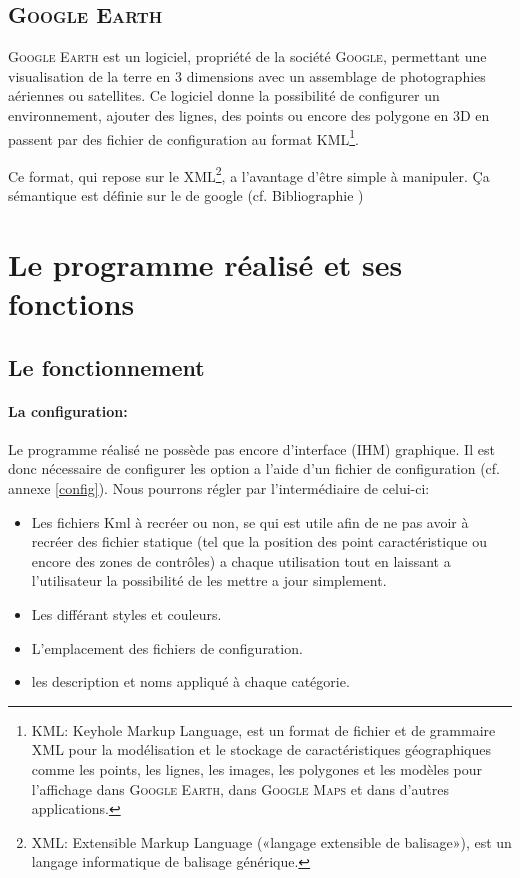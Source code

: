     \subsection{\textsc{Google Earth}}
\textsc{Google Earth} est un logiciel, propriété de la société \textsc{Google}, permettant une visualisation de la terre en 3 dimensions avec un assemblage de photographies aériennes ou satellites. Ce logiciel donne la possibilité de configurer un environnement, ajouter des lignes, des points ou encore des polygone en 3D en passent par des fichier de configuration au format KML\footnote{\label{Kml}KML: Keyhole Markup Language, est un format de fichier et de grammaire XML pour la modélisation et le stockage de caractéristiques géographiques comme les points, les lignes, les images, les polygones et les modèles pour l'affichage dans \textsc{Google Earth}, dans \textsc{Google Maps} et dans d'autres applications.}.

Ce format, qui repose sur le XML\footnote{XML: Extensible Markup Language («langage extensible de balisage»), est un langage informatique de balisage générique.}, a l'avantage d’être simple à manipuler. Ça sémantique est définie sur le de google (cf. Bibliographie \cite{gecode}) 



\section{Le programme réalisé et ses fonctions}
    \subsection{Le fonctionnement}
            \paragraph{La configuration:}
Le programme réalisé ne possède pas encore d'interface (IHM) graphique. Il est donc nécessaire de configurer les option a l'aide d'un fichier de configuration (cf. annexe \vref{config}). Nous pourrons régler par l'intermédiaire de celui-ci:
\begin{itemize}
    \item Les fichiers Kml à recréer ou non, se qui est utile afin de ne pas avoir à recréer des fichier statique (tel que la position des point caractéristique ou encore des zones de contrôles) a chaque utilisation tout en laissant a l'utilisateur la possibilité de les mettre a jour simplement.
    \item Les différant styles et couleurs.
    \item L'emplacement des fichiers de configuration.
    \item les description et noms appliqué à chaque catégorie.
\end{itemize}
